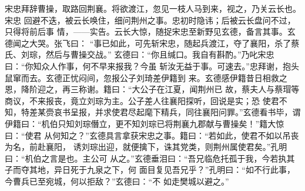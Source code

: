 宋忠拜辞曹操，取路回荆襄。将欲渡江，忽见一枝人马到来，视之，乃关云长也。宋忠
回避不迭，被云长唤住，细问荆州之事。忠初时隐讳；后被云长盘问不过，只得将前后事
情，——实告。云长大惊，随捉宋忠至新野见玄德，备言其事。玄德闻之大哭。张飞曰：
“事已如此，可先斩宋忠，随起兵渡江，夺了襄阳，杀了蔡氏、刘琮，然后与曹操交战。”
玄德曰：“你且缄口。我自有斟酌。”乃叱宋忠曰：“你知众人作事，何不早来报我？今虽
斩汝无益于事。可速去。”忠拜谢，抱头鼠窜而去。玄德正忧闷间，忽报公子刘琦差伊籍到
来。玄德感伊籍昔日相救之恩，降阶迎之，再三称谢。籍曰：“大公子在江夏，闻荆州已
故，蔡夫人与蔡瑁等商议，不来报丧，竟立刘琮为主。公子差人往襄阳探听，回说是实；恐
使君不知，特差某赍哀书呈报，并求使君尽起麾下精兵，同往襄阳问罪。”玄德看书毕，谓
伊籍曰：“机伯只知刘琮僭立，更不知刘琮已将荆襄九郡献与曹操矣！”籍大惊曰：“使君
从何知之？”玄德具言拿获宋忠之事。籍曰：“若如此，使君不如以吊丧为名，前赴襄阳，
诱刘琮出迎，就便擒下，诛其党类，则荆州属使君矣。”孔明曰：“机伯之言是也。主公可
从之。”玄德垂泪曰：“吾兄临危托孤于我，今若执其子而夺其地，异日死于九泉之下，何
面目复见吾兄乎？”孔明曰：“如不行此事，今曹兵已至宛城，何以拒敌？”玄德曰：“不
如走樊城以避之。”

